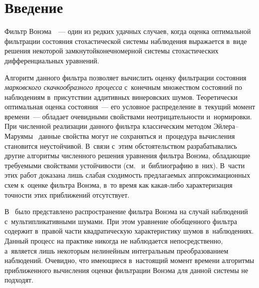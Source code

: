 
  



\thispagestyle{headings}

\begin{multicols}{2}

\label{st\stat}



 \section{Введение}
 
 Фильтр Вонэма~\cite{Won_65}~--- один из редких удачных случаев, когда 
 оценка оптимальной фильтрации состо\-яния стохастической системы наблюдения 
 выражается в~виде решения некоторой замк\-ну\-той\linebreak конечномерной сис\-те\-мы 
 стохастических дифференциальных уравнений. 
 
 Алгоритм данного фильт\-ра 
 позволяет вычислить оценку фильт\-ра\-ции со\-сто\-яния \textit{марковского скачкообразного 
 процесса} с~\mbox{конечным} множеством состояний по наблюдениям в~присутствии 
 аддитивных винеровских шумов. Теоретически оптимальная оценка со\-сто\-яния~--- 
 его условное распределение в~текущий момент времени~--- 
 обладает очевидными свойствами неотрицательности и~нормировки. 
 При чис\-лен\-ной реализации данного фильтра классическим методом 
 Эй\-ле\-ра--Ма\-ру\-ямы~\cite{KP_92} данные свойства могут не сохраняться и~процедура 
 вы\-чис\-ле\-ния становится неустойчивой.  В~связи с~этим обстоятельством разрабатывались 
 другие алгоритмы чис\-лен\-но\-го решения уравнения фильтра Вонэма, обладающие 
 требуемыми свойствами устойчивости (см.~\cite{YZL_04, PR_10} и~библиографию в~них). 
 В~час\-ти этих работ доказана лишь слабая сходимость пред\-ла\-га\-емых аппроксимационных 
 схем к~оценке фильт\-ра Вонэма, в~то время как ка\-кая-ли\-бо 
 характеризация точ\-ности этих приближений отсутствует.
 
 В~\cite{B_18} было представлено распространение фильт\-ра Вонэма на случай 
 наблюдений с~мультипликативными шумами. При этом уравнение обобщенного 
 фильт\-ра содержит в~правой части квадратическую характеристику шумов в~наблюдениях. 
 Данный процесс на практике никогда не наблюдается непосредственно, а~является лишь 
 некоторым нелинейным интегральным преобразованием наблюдений. Очевидно, что 
 имеющиеся в~настоящий момент времени алгоритмы приближенного вычисления оценки 
 фильтрации Вонэма для данной системы не подходят. 
 

\end{multicols}
